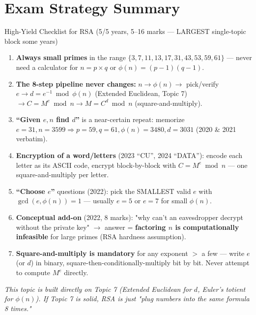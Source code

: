 \documentclass[12pt,a4paper]{article}
\begin{document}
\section*{Exam Strategy Summary}

\begin{keybox}{High-Yield Checklist for RSA (5/5 years, 5--16 marks --- LARGEST single-topic block some years)}
\begin{enumerate}[noitemsep]
  \item \textbf{Always small primes} in the range $\{3,7,11,13,17,31,43,53,59,61\}$ --- never need a calculator for $n=p\times q$ or $\phi(n)=(p-1)(q-1)$.
  \item \textbf{The 8-step pipeline never changes:} $n \to \phi(n) \to$ pick/verify $e \to d=e^{-1}\bmod\phi(n)$ (Extended Euclidean, Topic 7) $\to C=M^e\bmod n \to M=C^d\bmod n$ (square-and-multiply).
  \item \textbf{``Given $e,n$ find $d$''} is a near-certain repeat: memorize $e=31,n=3599 \Rightarrow p=59,q=61,\phi(n)=3480,d=3031$ (2020 \& 2021 verbatim).
  \item \textbf{Encryption of a word/letters} (2023 ``CU'', 2024 ``DATA''): encode each letter as its ASCII code, encrypt block-by-block with $C=M^e\bmod n$ --- one square-and-multiply per letter.
  \item \textbf{``Choose $e$''} questions (2022): pick the SMALLEST valid $e$ with $\gcd(e,\phi(n))=1$ --- usually $e=5$ or $e=7$ for small $\phi(n)$.
  \item \textbf{Conceptual add-on} (2022, 8 marks): "why can't an eavesdropper decrypt without the private key" $\to$ answer = \textbf{factoring $n$ is computationally infeasible} for large primes (RSA hardness assumption).
  \item \textbf{Square-and-multiply is mandatory} for any exponent $>$ a few --- write $e$ (or $d$) in binary, square-then-conditionally-multiply bit by bit. Never attempt to compute $M^e$ directly.
\end{enumerate}
\textit{This topic is built directly on Topic 7 (Extended Euclidean for $d$, Euler's totient for $\phi(n)$). If Topic 7 is solid, RSA is just "plug numbers into the same formula 8 times."}
\end{keybox}
\end{document}
